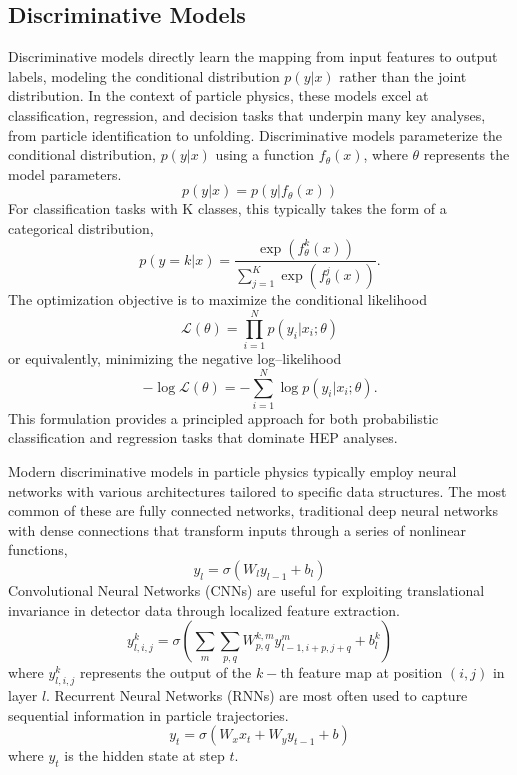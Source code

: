     
\subsection{Discriminative Models}
    Discriminative models directly learn the mapping from input features to output labels, modeling the conditional distribution \(p(y|x)\) rather than the joint distribution.
    In the context of particle physics, these models excel at classification, regression, and decision tasks that underpin many key analyses, from particle identification to unfolding.
    Discriminative models parameterize the conditional distribution, \(p(y|x)\) using a function \(f_\theta(x)\), where \(\theta\) represents the model parameters.
    \begin{equation}
        p(y|x) = p(y|f_\theta(x))
    \end{equation}
    For classification tasks with K classes, this typically takes the form of a categorical distribution,
    \begin{equation}
        p(y=k|x) = \frac{\exp(f_\theta^k(x))}{\sum_{j=1}^K \exp(f_\theta^j(x))}.
    \end{equation}
    The optimization objective is to maximize the conditional likelihood
    \begin{equation}
        \mathcal{L}(\theta) = \prod_{i=1}^N p(y_i|x_i; \theta)
    \end{equation}
    or equivalently, minimizing the negative log--likelihood
    \begin{equation}
        -\log \mathcal{L}(\theta) = -\sum_{i=1}^N \log p(y_i|x_i; \theta).
    \end{equation}
    This formulation provides a principled approach for both probabilistic classification and regression tasks that dominate HEP analyses.
    
    Modern discriminative models in particle physics typically employ neural networks with various architectures tailored to specific data structures.
    The most common of these are fully connected networks, traditional deep neural networks with dense connections that transform inputs through a series of nonlinear functions,
    \begin{equation}
        y_l = \sigma(W_l y_{l-1} + b_l)
    \end{equation}
    Convolutional Neural Networks (CNNs) are useful for exploiting translational invariance in detector data through localized feature extraction.
    \begin{equation}
        y_{l,i,j}^k = \sigma\left(\sum_{m}\sum_{p,q} W_{p,q}^{k,m} y_{l-1,i+p,j+q}^m + b_l^k\right)
    \end{equation}
    where \(y_{l,i,j}^k\) represents the output of the \(k-\)th feature map at position \((i,j)\) in layer \(l\).
    Recurrent Neural Networks (RNNs) are most often used to capture sequential information in particle trajectories.
    \begin{equation}
        y_t = \sigma(W_x x_t + W_y y_{t-1} + b)
    \end{equation}
    where \(y_t\) is the hidden state at step \(t\).
